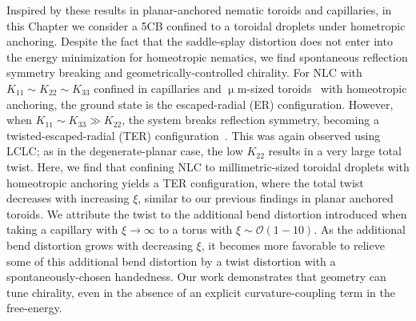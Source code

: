 Inspired by these results in planar-anchored nematic toroids and capillaries, in this Chapter we consider a 5CB confined to a toroidal droplets under hometropic anchoring.
Despite the fact that the saddle-splay distortion does not enter into the energy minimization for homeotropic nematics, we find spontaneous reflection symmetry breaking and geometrically-controlled chirality.
For NLC with $K_{11}\sim K_{22} \sim K_{33}$ confined in capillaries and $\upmu$m-sized toroids~\cite{RN274} with homeotropic anchoring, the ground state is the escaped-radial (ER) configuration.
However, when $K_{11}\sim K_{33} \gg K_{22}$, the system breaks reflection symmetry, becoming a twisted-escaped-radial (TER) configuration~\cite{RN192}.
This was again observed using LCLC; as in the degenerate-planar case, the low $K_{22}$ results in a very large total twist.
Here, we find that confining NLC to millimetric-sized toroidal droplets with homeotropic anchoring yields a TER configuration, where the total twist decreases with increasing $\xi$, similar to our previous findings in planar anchored toroids.
We attribute the twist to the additional bend distortion introduced when taking a capillary with $\xi \rightarrow \infty$ to a torus with $\xi \sim \mathcal{O}(1-10)$.
As the additional bend distortion grows with decreasing $\xi$, it becomes more favorable to relieve some of this additional bend distortion by a twist distortion with a spontaneously-chosen handedness.
Our work demonstrates that geometry can tune chirality, even in the absence of an explicit curvature-coupling term in the free-energy.

